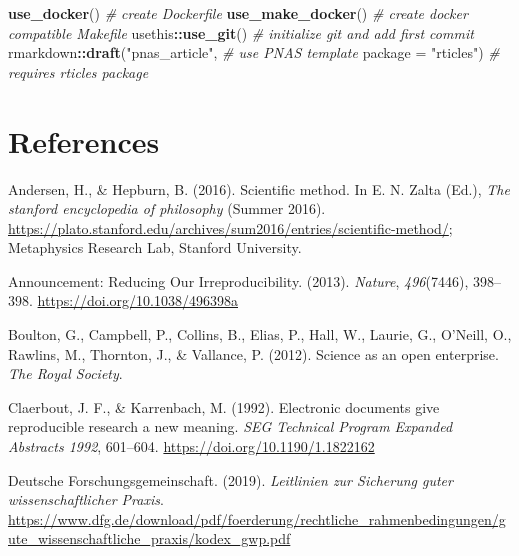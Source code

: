 \documentclass[12pt,a4paper,]{article}
\newenvironment{Shaded}{\begin{snugshade}}{\end{snugshade}}
\newcommand{\CommentTok}[1]{\textcolor[rgb]{0.56,0.35,0.01}{\textit{#1}}}
\newcommand{\DataTypeTok}[1]{\textcolor[rgb]{0.13,0.29,0.53}{#1}}
\newcommand{\KeywordTok}[1]{\textcolor[rgb]{0.13,0.29,0.53}{\textbf{#1}}}
\newcommand{\NormalTok}[1]{#1}
\newcommand{\OperatorTok}[1]{\textcolor[rgb]{0.81,0.36,0.00}{\textbf{#1}}}
\newcommand{\StringTok}[1]{\textcolor[rgb]{0.31,0.60,0.02}{#1}}
\begin{document}
\begin{Shaded}
\begin{Highlighting}[]
\KeywordTok{use_docker}\NormalTok{() }\CommentTok{# create Dockerfile}
\KeywordTok{use_make_docker}\NormalTok{() }\CommentTok{# create docker compatible Makefile}
\NormalTok{usethis}\OperatorTok{::}\KeywordTok{use_git}\NormalTok{() }\CommentTok{# initialize git and add first commit}
\NormalTok{rmarkdown}\OperatorTok{::}\KeywordTok{draft}\NormalTok{(}\StringTok{"pnas_article"}\NormalTok{, }\CommentTok{# use PNAS template}
                 \DataTypeTok{package =} \StringTok{"rticles"}\NormalTok{) }\CommentTok{# requires rticles package}
\end{Highlighting}
\end{Shaded}

\hypertarget{references}{%
\section*{References}\label{references}}

\hypertarget{refs}{}
\leavevmode\hypertarget{ref-andersonScientificMethod2016}{}%
Andersen, H., \& Hepburn, B. (2016). Scientific method. In E. N. Zalta (Ed.), \emph{The stanford encyclopedia of philosophy} (Summer 2016). \url{https://plato.stanford.edu/archives/sum2016/entries/scientific-method/}; Metaphysics Research Lab, Stanford University.

\leavevmode\hypertarget{ref-AnnouncementReducingOur2013}{}%
Announcement: Reducing Our Irreproducibility. (2013). \emph{Nature}, \emph{496}(7446), 398--398. \url{https://doi.org/10.1038/496398a}

\leavevmode\hypertarget{ref-boultonScienceOpenEnterprise2012}{}%
Boulton, G., Campbell, P., Collins, B., Elias, P., Hall, W., Laurie, G., O'Neill, O., Rawlins, M., Thornton, J., \& Vallance, P. (2012). Science as an open enterprise. \emph{The Royal Society}.

\leavevmode\hypertarget{ref-claerboutElectronicDocumentsGive1992}{}%
Claerbout, J. F., \& Karrenbach, M. (1992). Electronic documents give reproducible research a new meaning. \emph{SEG Technical Program Expanded Abstracts 1992}, 601--604. \url{https://doi.org/10.1190/1.1822162}

\leavevmode\hypertarget{ref-dfg2019}{}%
Deutsche Forschungsgemeinschaft. (2019). \emph{Leitlinien zur Sicherung guter wissenschaftlicher Praxis}. \url{https://www.dfg.de/download/pdf/foerderung/rechtliche_rahmenbedingungen/gute_wissenschaftliche_praxis/kodex_gwp.pdf}
\end{document}
